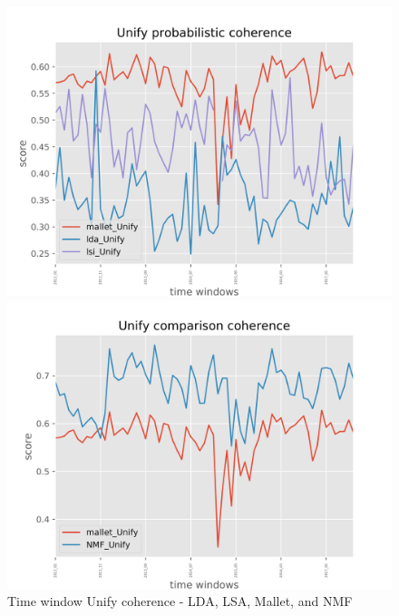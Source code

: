 \begin{figure}[!ht]
  \centering
  \begin{minipage}[b]{0.45\textwidth}
    \includegraphics[width=\textwidth]{img/Unify_probabilistic_all_coherence_plot.png}
  \end{minipage}
  \hfill
  \begin{minipage}[b]{0.45\textwidth}
    \includegraphics[width=\textwidth]{img/Unify_comparison_all_coherence_plot.png}
  \end{minipage}
  \caption{Time window Unify coherence - LDA, LSA, Mallet, and NMF}
  \label{fig:window_Unify_coherence_all}
\end{figure}

